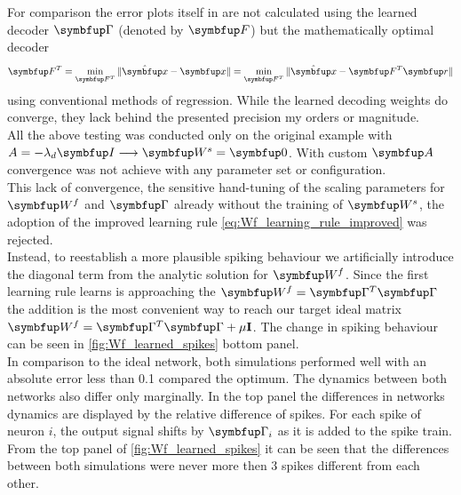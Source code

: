 For comparison the error plots itself in \cite{brendel_learning_2020} are not calculated using the learned decoder $\bmu{\Gamma}$ (denoted by $\bmu{F}$) but the mathematically optimal decoder
\begin{equation}
\bmu{F}^T = \min_{\bmu{F}^T} \|\hat{\bmu{x}} - \bmu{x}\| = \min_{\bmu{F}^T} \|\hat{\bmu{x}} - \bmu{F}^T\bmu{r}\|
\end{equation}
using conventional methods of regression. While the learned decoding weights do converge, they lack behind the presented precision my orders or magnitude.\\
All the above testing was conducted only on the original example with $A = -\lambda_d\bmu{I} \longrightarrow \bmu{W}^s = \bmu{0}$. With custom $\bmu{A}$ convergence was not achieve with any parameter set or configuration.\\
This lack of convergence, the sensitive hand-tuning of the scaling parameters for $\bmu{W}^f$ and $\bmu{\Gamma}$ already without the training of $\bmu{W}^s$, the adoption of the improved learning rule \cref{eq:Wf_learning_rule_improved} was rejected.\\
Instead, to reestablish a more plausible spiking behaviour we
artificially introduce the diagonal term from the analytic solution for $\bmu{W}^f$. Since the first learning rule learns is approaching the $\bmu{W}^f = \bmu{\Gamma}^T\bmu{\Gamma}$ the addition is the most convenient way to reach our target ideal matrix $\bmu{W}^f = \bmu{\Gamma}^T\bmu{\Gamma} + \mu\mathbf{I}$. The change in spiking behaviour can be seen in \cref{fig:Wf_learned_spikes} bottom panel.\\
In comparison to the ideal network, both simulations performed well with an absolute error less than 0.1 compared the optimum. The dynamics between both networks also differ only marginally. In the top panel the differences in networks dynamics are displayed by the relative difference of spikes. For each spike of neuron $i$, the output signal shifts by $\bmu{\Gamma}_i$ as it is added to the spike train. From the top panel of \cref{fig:Wf_learned_spikes} it can be seen that the differences between both simulations were never more then 3 spikes different from each other.

